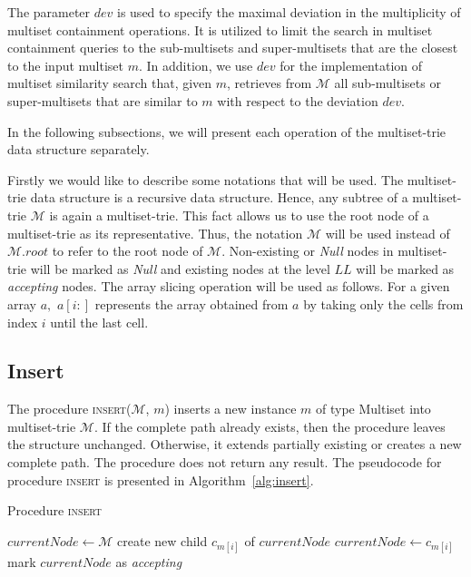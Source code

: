 The parameter $dev$ is used to specify the maximal deviation in the multiplicity
of multiset containment operations. It is utilized to limit the search in multiset
containment queries to the sub-multisets and super-multisets that are
the closest to the input multiset $m$. In addition, we use $dev$ for
the implementation of multiset similarity search that, given $m$, retrieves
from $\mathcal{M}$ all sub-multisets or super-multisets that are similar to $m$
with respect to the deviation $dev$.

In the following subsections, we will present each operation of the multiset-trie 
data structure separately. 

Firstly we would like to describe some notations that will be used. The 
multiset-trie data structure is a recursive data structure. Hence, any subtree 
of a multiset-trie $\mathcal{M}$ is again a multiset-trie. This fact allows 
us to use the root node of a multiset-trie as its representative. Thus, the notation 
$\mathcal{M}$ will be used instead of $\mathcal{M}.root$ to refer to the root 
node of $\mathcal{M}.$ Non-existing or \emph{Null} nodes in multiset-trie will 
be marked as \emph{Null} and existing nodes at the level $LL$ will be marked 
as \emph{accepting} nodes. The array slicing operation will be used as follows. 
For a given array $a,$ $a[i:]$ represents the array obtained from $a$ by taking 
only the cells from index $i$ until the last cell. 


\subsection{Insert} \label{s:insert}
The procedure \textsc{insert}($\mathcal{M}$, $m$) inserts a new instance $m$ of 
type Multiset into multiset-trie $\mathcal{M}$. If the complete path already 
exists, then the procedure leaves the structure unchanged. Otherwise, it extends 
partially existing or creates a new complete path. The procedure does not return 
any result. The pseudocode for procedure \textsc{insert} is presented in 
Algorithm~\ref{alg:insert}.


\begin{algorithm}[h!]
\caption{Procedure \textsc{insert}}
\label{alg:insert}
\begin{algorithmic}[1]
\State $currentNode \gets \mathcal{M}$
\State create new child $c_{m[i]}$ of $currentNode$
\EndIf
\State $currentNode \gets c_{m[i]}$
\EndFor
\State mark $currentNode$ as \emph{accepting}
\EndProcedure
\end{algorithmic}
\end{algorithm}

